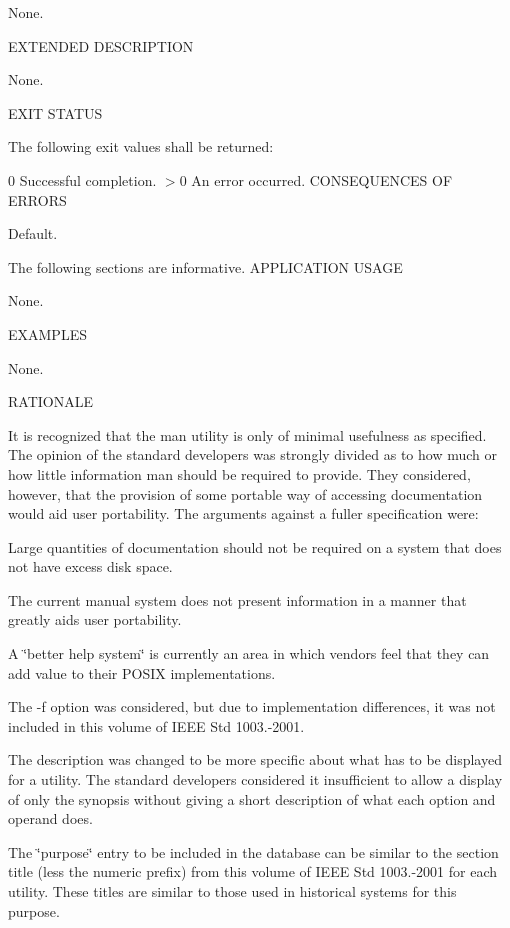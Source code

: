 None.

E\-X\-T\-E\-N\-D\-E\-D D\-E\-S\-C\-R\-I\-P\-T\-I\-O\-N

None.

E\-X\-I\-T S\-T\-A\-T\-U\-S

The following exit values shall be returned\-:

0 Successful completion. $>$0 An error occurred. C\-O\-N\-S\-E\-Q\-U\-E\-N\-C\-E\-S O\-F E\-R\-R\-O\-R\-S

Default.

The following sections are informative. A\-P\-P\-L\-I\-C\-A\-T\-I\-O\-N U\-S\-A\-G\-E

None.

E\-X\-A\-M\-P\-L\-E\-S

None.

R\-A\-T\-I\-O\-N\-A\-L\-E

It is recognized that the man utility is only of minimal usefulness as specified. The opinion of the standard developers was strongly divided as to how much or how little information man should be required to provide. They considered, however, that the provision of some portable way of accessing documentation would aid user portability. The arguments against a fuller specification were\-:

Large quantities of documentation should not be required on a system that does not have excess disk space.

The current manual system does not present information in a manner that greatly aids user portability.

A \char`\"{}better help system\char`\"{} is currently an area in which vendors feel that they can add value to their P\-O\-S\-I\-X implementations.

The -\/f option was considered, but due to implementation differences, it was not included in this volume of I\-E\-E\-E Std 1003.-\/2001.

The description was changed to be more specific about what has to be displayed for a utility. The standard developers considered it insufficient to allow a display of only the synopsis without giving a short description of what each option and operand does.

The \char`\"{}purpose\char`\"{} entry to be included in the database can be similar to the section title (less the numeric prefix) from this volume of I\-E\-E\-E Std 1003.-\/2001 for each utility. These titles are similar to those used in historical systems for this purpose.

